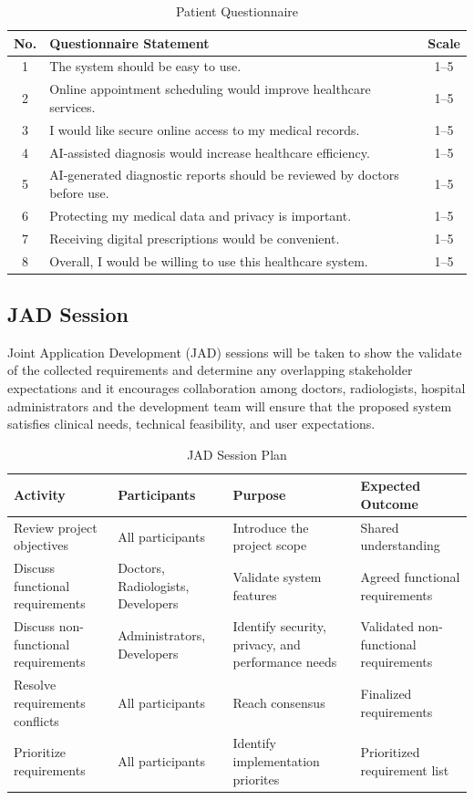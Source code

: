 \documentclass[12pt,a4paper]{report}
\begin{document}
\begin{table}[H]
\centering
\caption{Patient Questionnaire}
\begin{tabular}{|c|p{10cm}|c|}
\hline
\textbf{No.} & \textbf{Questionnaire Statement} & \textbf{Scale} \\
\hline
1 & The system should be easy to use. & 1--5 \\
\hline
2 & Online appointment scheduling would improve healthcare services. & 1--5 \\
\hline
3 & I would like secure online access to my medical records. & 1--5 \\
\hline
4 & AI-assisted diagnosis would increase healthcare efficiency. & 1--5 \\
\hline
5 & AI-generated diagnostic reports should be reviewed by doctors before use. & 1--5 \\
\hline
6 & Protecting my medical data and privacy is important. & 1--5 \\
\hline
7 & Receiving digital prescriptions would be convenient. & 1--5 \\
\hline
8 & Overall, I would be willing to use this healthcare system. & 1--5 \\
\hline
\end{tabular}
\end{table}

\subsection{JAD Session}

Joint Application Development (JAD) sessions will be taken to show the validate of the collected requirements and determine any overlapping stakeholder expectations and it encourages collaboration among doctors, radiologists, hospital administrators and the development team will ensure that the proposed system satisfies clinical needs, technical feasibility, and user expectations.

\begin{table}[H]
\centering
\caption{JAD Session Plan}
\begin{tabular}{|p{3.5cm}|p{4cm}|p{3cm}|p{4cm}|}
\hline
\textbf{Activity} & \textbf{Participants} & \textbf{Purpose} & \textbf{Expected Outcome} \\
\hline
Review project objectives & All participants & Introduce the project scope & Shared understanding \\
\hline
Discuss functional requirements & Doctors, Radiologists, Developers & Validate system features & Agreed functional requirements \\
\hline
Discuss non-functional requirements & Administrators, Developers & Identify security, privacy, and performance needs & Validated non-functional requirements \\
\hline
Resolve requirements conflicts & All participants & Reach consensus & Finalized requirements \\
\hline
Prioritize requirements & All participants & Identify implementation priorites & Prioritized requirement list \\
\hline
\end{tabular}
\end{table}
\end{document}
